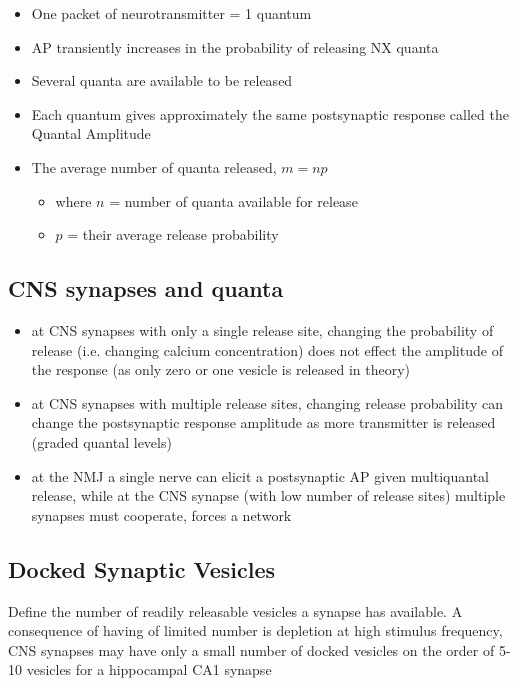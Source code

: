 \documentclass{article}
\begin{document}
\begin{itemize}
    \item One packet of neurotransmitter = 1 quantum
    \item AP transiently increases in the probability of releasing NX quanta
    \item Several quanta are available to be released
    \item Each quantum gives approximately the same postsynaptic response called the Quantal Amplitude
    \item The average number of quanta released, $m = np$
      \begin{itemize}
        \item where $n$ = number of quanta available for release
        \item $p$ = their average release probability
      \end{itemize}
\end{itemize}

\subsection{CNS synapses and quanta}

\begin{itemize}
    \item at CNS synapses with only a single release site, changing the probability of release (i.e. changing calcium concentration) does not effect the amplitude of the response (as only zero or one vesicle is released in theory)
    \item at CNS synapses with multiple release sites, changing release probability can change the postsynaptic response amplitude as more transmitter is released (graded quantal levels)
    \item at the NMJ a single nerve can elicit a postsynaptic AP given multiquantal release, while at the CNS synapse (with low number of release sites) multiple synapses must cooperate, forces a network
\end{itemize}

\subsection{Docked Synaptic Vesicles}

Define the number of readily releasable vesicles a synapse has available. A consequence of having of limited number is depletion at high stimulus frequency, CNS synapses may have only a small number of docked vesicles on the order of 5-10 vesicles for a hippocampal CA1 synapse
\end{document}
